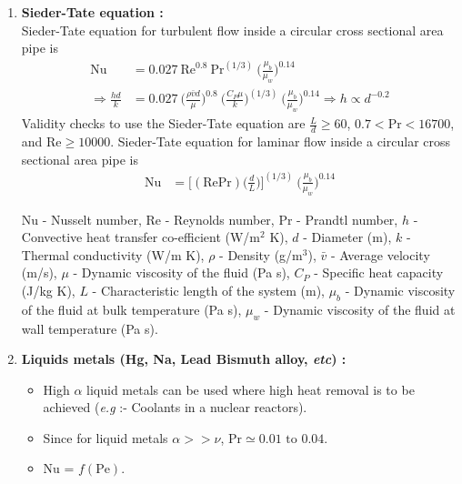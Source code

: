 \documentclass[a4paper, 12 pt]{article}
\begin{document}
\begin{enumerate}
        
        \item \textbf{Sieder-Tate equation :} \\Sieder-Tate equation for turbulent flow inside a circular cross sectional area pipe is
        \begin{align}
            \text{Nu} &= 0.027 \ \text{Re}^{0.8}\ \text{Pr}^{(1/3)}\ \bigg( \frac{\mu _b}{\mu _w} \bigg)^{0.14}\\
            \Rightarrow \frac{hd}{k} &= 0.027 \ \bigg( \frac{\rho \bar{v} d}{\mu} \bigg)^{0.8}\ \bigg( \frac{C_P \mu}{k} \bigg)^{(1/3)}\ \bigg( \frac{\mu _b}{\mu _w} \bigg)^{0.14} \label{STE} \Rightarrow \boxed{h \propto d^{-0.2}}
        \end{align}
        Validity checks to use the Sieder-Tate equation are $\frac{L}{d} \geq 60$, $0.7<\text{Pr}<16700$, and $\text{Re} \geq 10000$. Sieder-Tate equation for laminar flow inside a circular cross sectional area pipe is
        \begin{align}
            \text{Nu} &= \bigg[(\text{RePr})\bigg(\frac{d}{L}\bigg)\bigg]^{(1/3)}\ \bigg( \frac{\mu _b}{\mu _w} \bigg)^{0.14}
        \end{align}
        
        \vspace{3 mm} Nu -  Nusselt number, Re - Reynolds  number, Pr -  Prandtl number, $h$ - Convective heat transfer co-efficient (W/m$^2$ K), $d$ - Diameter (m), $k$ - Thermal conductivity (W/m K), $\rho$ - Density (g/m$^3$), $\bar{v}$ - Average velocity (m/s),
        $\mu$ - Dynamic viscosity of the fluid (Pa s), $C_P$ - Specific heat capacity (J/kg K), $L$ - Characteristic length of the system (m), $\mu _b$ - Dynamic viscosity of the fluid at bulk temperature (Pa s), $\mu _w$ - Dynamic viscosity of the fluid at wall temperature (Pa s).
        
        \item \textbf{Liquids metals (Hg, Na, Lead Bismuth alloy, \textit{etc}) : }
        
        \begin{itemize}
            \item High $\alpha$ liquid metals can be used where high heat removal is to be achieved (\textit{e.g} :- Coolants in a nuclear reactors).
            
            \item Since for liquid metals $\alpha >> \nu$, $\text{Pr} \simeq 0.01 \text{ to } 0.04$.
            
            \item Nu = $f(\text{Pe})$.
        \end{itemize}
        

\end{enumerate}
\end{document}
